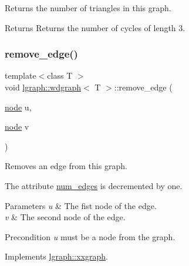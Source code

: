 Returns the number of triangles in this graph. 

\begin{DoxyReturn}{Returns}
Returns the number of cycles of length 3. 
\end{DoxyReturn}
\mbox{\label{classlgraph_1_1wdgraph_a6bdc75a07568928bc179dde03a814366}} 
\subsubsection{\texorpdfstring{remove\+\_\+edge()}{remove\_edge()}\hspace{0.1cm}{\footnotesize\ttfamily [1/2]}}
{\footnotesize\ttfamily template$<$class T $>$ \\
void \hyperlink{classlgraph_1_1wdgraph}{lgraph\+::wdgraph}$<$ T $>$\+::remove\+\_\+edge (\begin{DoxyParamCaption}\item[{\hyperlink{namespacelgraph_a397169dd66adf725210a30fb7251773e}{node}}]{u,  }\item[{\hyperlink{namespacelgraph_a397169dd66adf725210a30fb7251773e}{node}}]{v }\end{DoxyParamCaption})\hspace{0.3cm}{\ttfamily [virtual]}}



Removes an edge from this graph. 

The attribute \hyperlink{classlgraph_1_1xxgraph_a6765a9a3be42f6e0f824635c593b35d7}{num\+\_\+edges} is decremented by one. 
\begin{DoxyParams}{Parameters}
{\em u} & The fist node of the edge. \\
\hline
{\em v} & The second node of the edge. \\
\hline
\end{DoxyParams}
\begin{DoxyPrecond}{Precondition}
{\itshape u} must be a node from the graph. 
\end{DoxyPrecond}


Implements \hyperlink{classlgraph_1_1xxgraph_a7fd3a1309cde4f408c8d9d4cb3b898a8}{lgraph\+::xxgraph}.

\mbox{\label{classlgraph_1_1xxgraph_a46a75fa2a10a8674ab930e9dc766e2f9}} 
